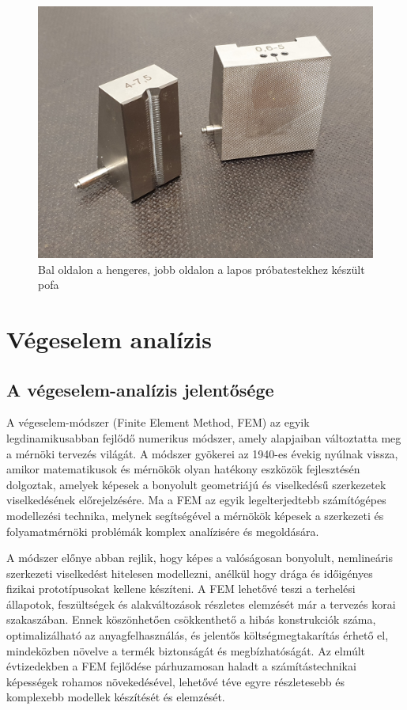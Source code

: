 \documentclass[12pt,a4paper,oneside]{report}
\begin{document}
\begin{figure}[H]
\centering
\includegraphics[width=12cm]{figures/pofak}
\caption{Bal oldalon a hengeres, jobb oldalon a lapos próbatestekhez készült pofa}
\label{Fig:pofak}
\end{figure}



\section{Végeselem analízis}
\subsection{A végeselem-analízis jelentősége}
A végeselem-módszer (Finite Element Method, FEM) az egyik legdinamikusabban fejlődő numerikus módszer, amely alapjaiban változtatta meg a mérnöki tervezés világát. A módszer gyökerei az 1940-es évekig nyúlnak vissza, amikor matematikusok és mérnökök olyan hatékony eszközök fejlesztésén dolgoztak, amelyek képesek a bonyolult geometriájú és viselkedésű szerkezetek viselkedésének előrejelzésére. Ma a FEM az egyik legelterjedtebb számítógépes modellezési technika, melynek segítségével a mérnökök képesek a szerkezeti és folyamatmérnöki problémák komplex analízisére és megoldására.

A módszer előnye abban rejlik, hogy képes a valóságosan bonyolult, nemlineáris szerkezeti viselkedést hitelesen modellezni, anélkül hogy drága és időigényes fizikai prototípusokat kellene készíteni. A FEM lehetővé teszi a terhelési állapotok, feszültségek és alakváltozások részletes elemzését már a tervezés korai szakaszában. Ennek köszönhetően csökkenthető a hibás konstrukciók száma, optimalizálható az anyagfelhasználás, és jelentős költségmegtakarítás érhető el, mindeközben növelve a termék biztonságát és megbízhatóságát. Az elmúlt évtizedekben a FEM fejlődése párhuzamosan haladt a számítástechnikai képességek rohamos növekedésével, lehetővé téve egyre részletesebb és komplexebb modellek készítését és elemzését.
\end{document}
